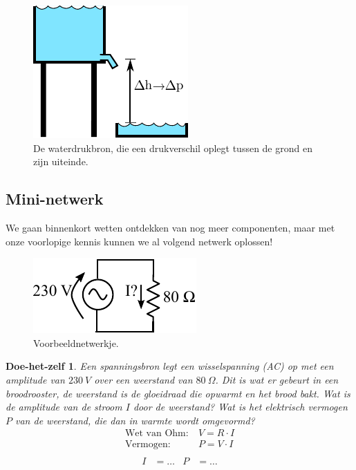 \documentclass{article}
\newtheorem{DIY}{Doe-het-zelf}
\begin{document}
		\begin{figure}[htbp]
				\centering
				\includegraphics{waterbron}
				\caption{De waterdrukbron, die een drukverschil oplegt tussen de grond en zijn uiteinde.}
				\label{fig:waterbron}
			\end{figure}
		\subsection{Mini-netwerk}
			We gaan binnenkort wetten ontdekken van nog meer componenten, maar met onze voorlopige kennis kunnen we al volgend netwerk oplossen!

			\begin{figure}[h!]
				\centering
				\includegraphics{vbweerstand.pdf}
				\caption{Voorbeeldnetwerkje.}
				\label{fig:vbweerstand}
			\end{figure}

			\begin{DIY} 
			Een spanningsbron legt een wisselspanning (AC) op met een amplitude van $230~V$ over een weerstand van $80~\Omega$. Dit is wat er gebeurt in een broodrooster, de weerstand is de gloeidraad die opwarmt en het brood bakt. Wat is de amplitude van de  stroom $I$ door de weerstand? Wat is het elektrisch vermogen $P$ van de weerstand, die dan in warmte wordt omgevormd?
			\begin{align*}
				\text{Wet van Ohm:}~&V = R\cdot I \\
				\text{Vermogen:}~&P = V\cdot I \\
			\end{align*}
			\begin{align}
			    I&= \ldots & P&= \ldots 
			\end{align}
			\end{DIY}
\end{document}
